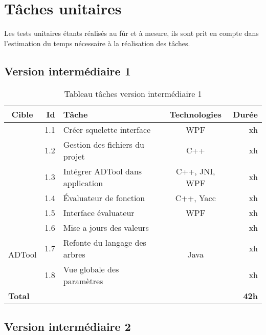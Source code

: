 \section{Tâches unitaires}
	\label{sec:taches_unitaires}

	Les tests unitaires étants réalisés au fûr et à mesure, ils sont prit en compte dans l'estimation du temps nécessaire à la réalisation des tâches.

	\subsection{Version intermédiaire 1}

		\begin{table}
			\centering
			\begin{tabular}{|c|r|l|c|r|}
				\hline
				\textbf{Cible} & \textbf{Id} & \textbf{Tâche} & \textbf{Technologies} & \textbf{Durée}\\
				\hline

				\multirow{5}{*}{\glasir{}} & 1.1 & Créer squelette interface & WPF & xh\\
				\cline{2-5}
				 & 1.2 & Gestion des fichiers du projet & C++ & xh\\
				\cline{2-5}
				 & 1.3 & Intégrer ADTool dans application & C++, JNI, WPF & xh\\
				\cline{2-5}
				 & 1.4 & \'Evaluateur de fonction & C++, Yacc & xh\\
				\cline{2-5}
				 & 1.5 & Interface évaluateur & WPF & xh\\
				\hline

				\multirow{3}{*}{ADTool} & 1.6 & Mise a jours des valeurs & \multirow{3}{*}{Java} & xh\\
				\cline{2-3} \cline{5-5}
				 & 1.7 & Refonte du langage des arbres & & xh\\
				\cline{2-3} \cline{5-5}
				 & 1.8 & Vue globale des paramètres & & xh\\
				\hline

				\multicolumn{4}{|l|}{\bf Total} & {\bf 42h}\\
				\hline
			\end{tabular}
			\caption{Tableau tâches version intermédiaire 1}
			\label{fig:taches_units_1}
		\end{table}

	\subsection{Version intermédiaire 2}

